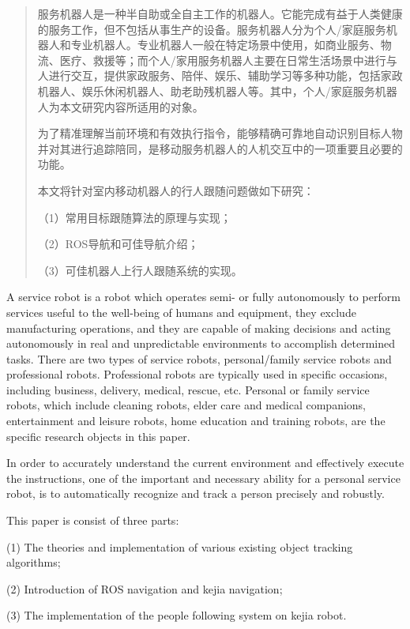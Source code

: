 
\begin{abstract}
  服务机器人是一种半自助或全自主工作的机器人。它能完成有益于人类健康的服务工作，但不包括从事生产的设备。服务机器人分为个人/家庭服务机器人和专业机器人。专业机器人一般在特定场景中使用，如商业服务、物流、医疗、救援等；而个人/家用服务机器人主要在日常生活场景中进行与人进行交互，提供家政服务、陪伴、娱乐、辅助学习等多种功能，包括家政机器人、娱乐休闲机器人、助老助残机器人等。其中，个人/家庭服务机器人为本文研究内容所适用的对象。

  为了精准理解当前环境和有效执行指令，能够精确可靠地自动识别目标人物并对其进行追踪陪同，是移动服务机器人的人机交互中的一项重要且必要的功能。

  本文将针对室内移动机器人的行人跟随问题做如下研究：

  （1）常用目标跟随算法的原理与实现；

  （2）ROS导航和可佳导航介绍；

  （3）可佳机器人上行人跟随系统的实现。

\end{abstract}

\begin{enabstract}
  A service robot is a robot which operates semi- or fully autonomously to perform services useful to the well-being of humans and equipment, they exclude manufacturing operations, and they are capable of making decisions and acting autonomously in real and unpredictable environments to accomplish determined tasks.  There are two types of service robots, personal/family service robots and professional robots. Professional robots are typically used in specific occasions, including business, delivery, medical, rescue, etc. Personal or family service robots, which include cleaning robots, elder care and medical companions, entertainment and leisure robots, home education and training robots, are the specific research objects in this paper.

  In order to accurately understand the current environment and effectively execute the instructions, one of the important and necessary ability for a personal service robot, is to automatically recognize and track a person precisely and robustly.

  This paper is consist of three parts:

  (1) The theories and implementation of various existing object tracking algorithms;

  (2) Introduction of ROS navigation and kejia navigation;

  (3) The implementation of the people following system on kejia robot.

\end{enabstract}
